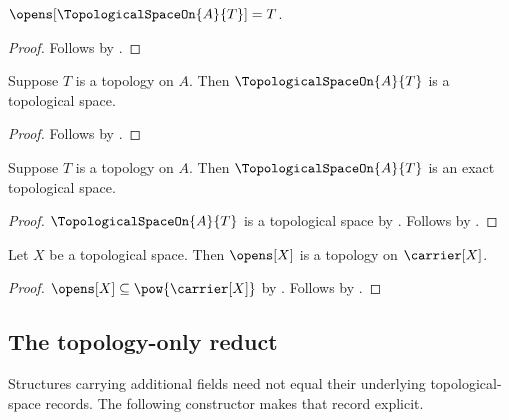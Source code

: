 \begin{proposition}\label{topological_space_on_opens}
    $\opens[\TopologicalSpaceOn{A}{T}]=T$.
\end{proposition}
\begin{proof}
    Follows by
        .
\end{proof}

\begin{classification}\label{topological_space_on_is_topological_space}
    Suppose $T$ is a topology on $A$.
    Then $\TopologicalSpaceOn{A}{T}$ is a topological space.
\end{classification}
\begin{proof}
    Follows by
        .
\end{proof}

\begin{theorem}\label{topological_space_on_is_exact}
    Suppose $T$ is a topology on $A$.
    Then $\TopologicalSpaceOn{A}{T}$ is an exact topological space.
\end{theorem}
\begin{proof}
    $\TopologicalSpaceOn{A}{T}$ is a topological space by
        .
    Follows by
        .
\end{proof}

\begin{theorem}\label{topological_space_opens_form_topology}
    Let $X$ be a topological space.
    Then $\opens[X]$ is a topology on $\carrier[X]$.
\end{theorem}
\begin{proof}
    $\opens[X]\subseteq\pow{\carrier[X]}$
        by .
    Follows by
        .
\end{proof}

\subsection{The topology-only reduct}

Structures carrying additional fields need not equal their underlying
topological-space records.  The following constructor makes that record
explicit.


